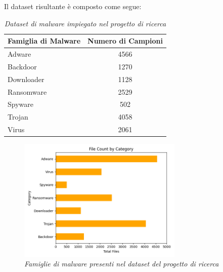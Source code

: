 \vspace{.5cm}
Il dataset risultante è composto come segue:
\begin{table}[h]
    \centering
    \begin{tabular}{|l|c|}
        \hline
        \textbf{Famiglia di Malware} & \textbf{Numero di Campioni} \\
        \hline
        Adware & 4566 \\
        \hline
        Backdoor & 1270 \\
        \hline
        Downloader & 1128 \\
        \hline
        Ransomware & 2529 \\
        \hline
        Spyware & 502 \\
        \hline
        Trojan & 4058 \\
        \hline
        Virus & 2061 \\
        \hline
    \end{tabular}
    \vspace{.2cm}
    \caption{\emph{Dataset di malware impiegato nel progetto di ricerca}}
\end{table}

\begin{figure}
    \centering
    \includegraphics[width=0.7\textwidth]{images/total_families.png}
    \caption{\emph{Famiglie di malware presenti nel dataset del progetto di ricerca}}
\end{figure}

\newpage

